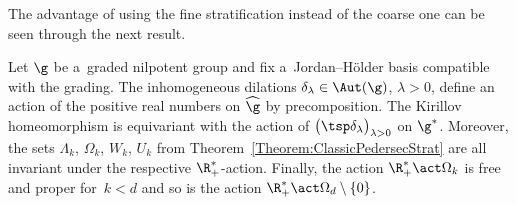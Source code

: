 The advantage of using the fine stratification instead of the coarse one can be seen through the next result.

\begin{lem}
 Let $\g$ be a~graded nilpotent group and fix a~Jordan--H\"older basis compatible with the grading. The inhomogeneous dilations $\delta_{\lambda} \in \Aut(\g)$, $\lambda > 0$, define an action of the positive real numbers on $\widehat{\g}$ by precomposition. The Kirillov homeomorphism  is equivariant with the action of $\bigl(\tsp\delta_{\lambda}\bigr)_{\lambda > 0}$ on $\g^*$.
 Moreover, the sets $\Lambda_k$, $\Omega_k$, $W_k$, $U_k$ from Theorem~{\rm\ref{Theorem:ClassicPedersecStrat}} are all invariant under the respective $\R^*_+$-action.
 Finally, the action $\R^*_+ \act \Omega_k$ is free and proper for~${k < d}$ and so is the action $\R^*_+\act \Omega_d\setminus\{0\}$.
\end{lem}

